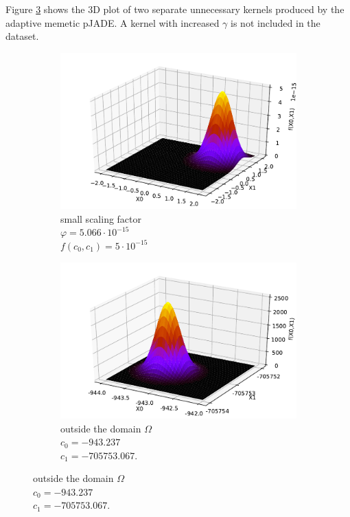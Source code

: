 \documentclass[./\jobname.tex]{subfiles}
\begin{document}
Figure \ref{fig:paJADE_pde0a_6kernel} shows the 3D plot of two separate unnecessary kernels produced by the adaptive memetic pJADE. A kernel with increased $\gamma$ is not included in the dataset.

\begin{figure}[H]
	\centering
	\begin{subfigure}[b]{0.42\linewidth}
		\centering
		\includegraphics[width=1\textwidth]{../../code/experiments/experiment_2/cipde0a_kernel6_small.pdf}
		\caption{small scaling factor \\ $\varphi=5.066\cdot 10^{-15}$ \\ $f(c_0,c_1)=5\cdot10^{-15}$}
		\label{fig:paJADE_pde0a_6kernel_out}
	\end{subfigure}%
	\begin{subfigure}[b]{0.42\linewidth}
		\centering
		\includegraphics[width=1\textwidth]{../../code/experiments/experiment_2/cipde0a_kernel6_out.pdf}
		\caption{outside the domain $\Omega$\\ $c_0=-943.237$ \\ $c_1=-705753.067$.}
		\label{fig:paJADE_pde0a_6kernel_small}
	\end{subfigure}%
	\label{fig:paJADE_pde0a_6kernel}
\end{figure}
\end{document}
